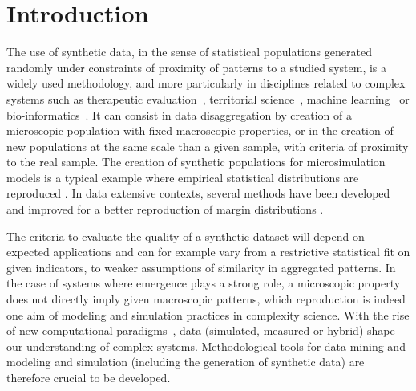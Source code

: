 \documentclass{bmcart}
\begin{document}
\section*{Introduction}



The use of synthetic data, in the sense of statistical populations generated randomly under constraints of proximity of patterns to a studied system, is a widely used methodology, and more particularly in disciplines related to complex systems such as therapeutic evaluation~\cite{abadie2010synthetic}, territorial science~\cite{moeckel2003creating,pritchard2009advances}, machine learning~\cite{bolon2013review} or bio-informatics~\cite{van2006syntren}. It can consist in data disaggregation by creation of a microscopic population with fixed macroscopic properties, or in the creation of new populations at the same scale than a given sample, with criteria of proximity to the real sample. The creation of synthetic populations for microsimulation models is a typical example where empirical statistical distributions are reproduced \cite{muller2010population}. In data extensive contexts, several methods have been developed and improved for a better reproduction of margin distributions \cite{barthelemy2013synthetic}.

The criteria to evaluate the quality of a synthetic dataset will depend on expected applications and can for example vary from a restrictive statistical fit on given indicators, to weaker assumptions of similarity in aggregated patterns. In the case of systems where emergence plays a strong role, a microscopic property does not directly imply given macroscopic patterns, which reproduction is indeed one aim of modeling and simulation practices in complexity science. With the rise of new computational paradigms~\cite{arthur2015complexity}, data (simulated, measured or hybrid) shape our understanding of complex systems. Methodological tools for data-mining and modeling and simulation (including the generation of synthetic data) are therefore crucial to be developed.

\end{document}
